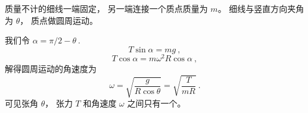 
\begin{issues}
\issueDraft
\end{issues}



质量不计的细线一端固定， 另一端连接一个质点质量为 $m$。 细线与竖直方向夹角为 $\theta$， 质点做圆周运动。

我们令 $\alpha = \pi/2 - \theta~.$
\begin{equation}
T\sin\alpha = mg~,
\end{equation}
\begin{equation}
T\cos\alpha = m\omega^2 R\cos\alpha~,
\end{equation}
解得圆周运动的角速度为
\begin{equation}
\omega = \sqrt{\frac{g}{R\cos\theta}} = \sqrt{\frac{T}{mR}}~.
\end{equation}
可见张角 $\theta$， 张力 $T$ 和角速度 $\omega$ 之间只有一个。
